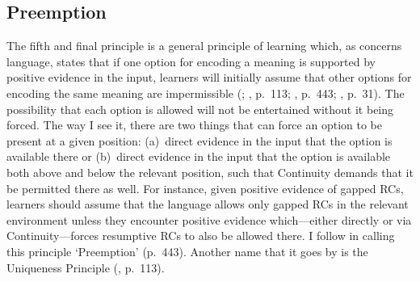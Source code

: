 \subsection{Preemption}\label{acq-preemption}

The fifth and final principle is a general principle of learning which, as concerns language, states that if one option for encoding a meaning is supported by positive evidence in the input, learners will initially assume that other options for encoding the same meaning are impermissible (\cite{berwick1985}; \cite{pinker1984}, p.~113; \cite{rutherford1986}, p.~443; \cite{trahey1992}, p.~31). The possibility that each option is allowed will not be entertained without it being forced. The way I see it, there are two things that can force an option to be present at a given position: (a)~direct evidence in the input that the option is available there or (b)~direct evidence in the input that the option is available both above and below the relevant position, such that Continuity demands that it be permitted there as well. For instance, given positive evidence of gapped RCs, learners should assume that the language allows only gapped RCs in the relevant environment unless they encounter positive evidence which---either directly or via Continuity---forces resumptive RCs to also be allowed there. I follow \textcite{rutherford1989} in calling this principle `Preemption' (p.~443). Another name that it goes by is the Uniqueness Principle (\cite{pinker1984}, p.~113).

